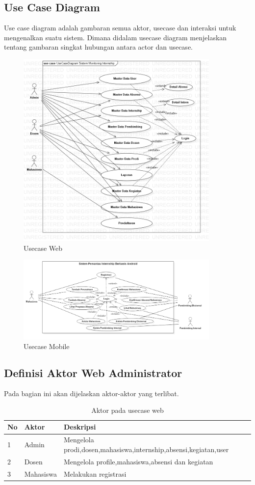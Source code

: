 \subsection{Use Case Diagram}
Use case diagram adalah gambaran semua aktor, usecase dan interaksi untuk mengenalkan suatu sistem. Dimana didalam usecase diagram menjelaskan tentang gambaran singkat hubungan antara actor dan usecase.
	\begin{figure}[H]
		\includegraphics[width=10cm]{figures/diagram/image022.png}
		\centering
		\caption{Usecase Web }
	\end{figure}
	\begin{figure}[H]
		\includegraphics[width=10cm]{figures/diagram/image023.png}
		\centering
		\caption{Usecase Mobile }
	\end{figure}
\subsection{Definisi Aktor Web Administrator}
Pada bagian ini akan dijelaskan aktor-aktor yang terlibat.
\begin{table}[h!]
\centering
\begin{tabular}{| l | p{2cm} | p{9cm} |} 
 \hline
 \textbf{No}   & \textbf{Aktor} & \textbf{Deskripsi}\\ 
\hline
1   & Admin & Mengelola prodi,dosen,mahasiswa,internship,absensi,kegiatan,user\\ 
\hline
2   & Dosen & Mengelola profile,mahasiswa,absensi dan kegiatan  \\ 
\hline
3   & Mahasiswa & Melakukan registrasi \\  
 \hline
\end{tabular}
\caption{Aktor pada usecase web}
\label{table:6}
\end{table}
